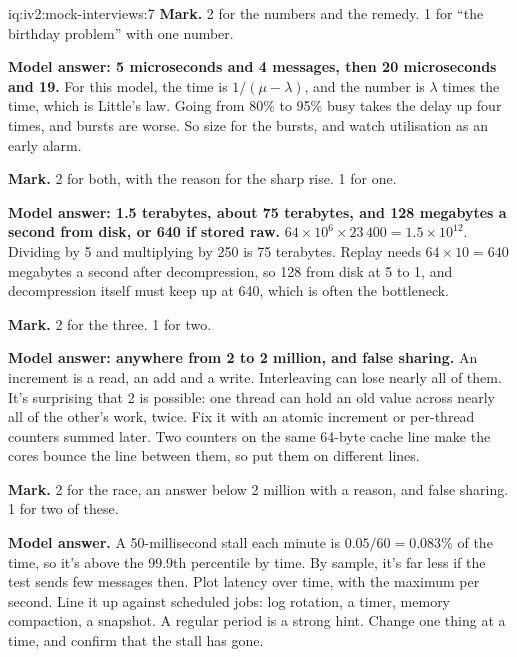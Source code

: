 \begin{solution}{iq:iv2:mock-interviews:7}
\textbf{Mark.} 2 for the numbers and the remedy. 1 for ``the birthday problem'' with one number.

\ivstop
\textbf{Model answer: 5 microseconds and 4 messages, then 20 microseconds and 19.} For this model, the time is $1/(\mu - \lambda)$, and the number is $\lambda$ times the time, which is Little's law. Going from 80\% to 95\% busy takes the delay up four times, and bursts are worse. So size for the bursts, and watch utilisation as an early alarm.

\textbf{Mark.} 2 for both, with the reason for the sharp rise. 1 for one.

\ivstop
\textbf{Model answer: 1.5 terabytes, about 75 terabytes, and 128 megabytes a second from disk, or 640 if stored raw.} $64 \times 10^6 \times 23\,400 = 1.5 \times 10^{12}$. Dividing by 5 and multiplying by 250 is 75 terabytes. Replay needs $64 \times 10 = 640$ megabytes a second after decompression, so 128 from disk at 5 to 1, and decompression itself must keep up at 640, which is often the bottleneck.

\textbf{Mark.} 2 for the three. 1 for two.

\ivstop
\textbf{Model answer: anywhere from 2 to 2 million, and false sharing.} An increment is a read, an add and a write. Interleaving can lose nearly all of them. It's surprising that 2 is possible: one thread can hold an old value across nearly all of the other's work, twice. Fix it with an atomic increment or per-thread counters summed later. Two counters on the same 64-byte cache line make the cores bounce the line between them, so put them on different lines.

\textbf{Mark.} 2 for the race, an answer below 2 million with a reason, and false sharing. 1 for two of these.

\ivstop
\textbf{Model answer.} A 50-millisecond stall each minute is $0.05/60 = 0.083\%$ of the time, so it's above the 99.9th percentile by time. By sample, it's far less if the test sends few messages then. Plot latency over time, with the maximum per second. Line it up against scheduled jobs: log rotation, a timer, memory compaction, a snapshot. A regular period is a strong hint. Change one thing at a time, and confirm that the stall has gone.


\end{solution}
